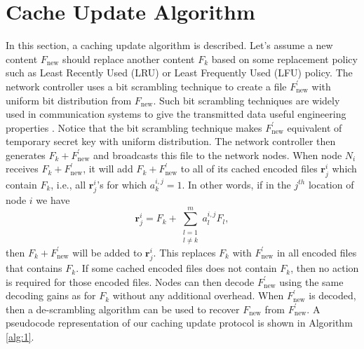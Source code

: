 \documentclass[10pt,journal]{IEEEtran}
\begin{document}
{\section{Cache Update Algorithm}
\label{cache_update}
In this section, a caching update algorithm is described. Let's assume a new content $F_{\textrm{new}}$ should replace another content $F_{k}$ based on some replacement policy {such as  Least Recently Used (LRU) or  Least Frequently Used (LFU) policy}. {The network  controller uses a bit scrambling technique to create a file $F_{\textrm{new}}^{'}$ with uniform bit distribution from $F_{\textrm{new}}$. Such bit scrambling techniques are widely used in communication systems to give the transmitted data useful engineering properties \cite{hui2003method}. 
Notice that the bit scrambling technique makes $F_{\textrm{new}}^{'}$ equivalent of temporary secret key with uniform distribution.} 
The network  controller then generates $F_{k} + F_{\textrm{new}}^{'}$ and broadcasts this file to the network nodes. When node $N_i$ receives $F_{k} + F_{\textrm{new}}^{'}$, it will add $F_{k} + F_{\textrm{new}}^{'}$ to all of its cached encoded files $\mathbf{r}^i_j$ which contain $F_{k}$, i.e., all $\mathbf{r}_j^i$'s for which $a_k^{i,j}=1$. In other words, if in the $j^{th}$ location of node $i$ we have 
\begin{equation}
   \mathbf{r}_j^i = F_k+\sum_{\substack{l=1 \\ l \neq k}}^{m} a_l^{i,j} F_l, 
   \label{eq_def_end}
\end{equation}
then $F_{k} + F_{\textrm{new}}^{'}$ will be added to $\mathbf{r}^i_j$. This replaces $F_k$ with $F_{\textrm{new}}^{'}$ in all encoded files that contains $F_k$. If some cached encoded files does not contain $F_k$, then no action is required for those encoded files. {Nodes can then decode $F_{\textrm{new}}^{'}$ using the same decoding gains as for $F_k$ without any additional overhead. When $F_{\textrm{new}}^{'}$ is decoded, then a de-scrambling algorithm can be used to recover $F_{\textrm{new}}$ from $F_{\textrm{new}}^{'}$.} %
A pseudocode representation of our caching update protocol is shown in Algorithm \ref{alg:1}.

}
\end{document}
